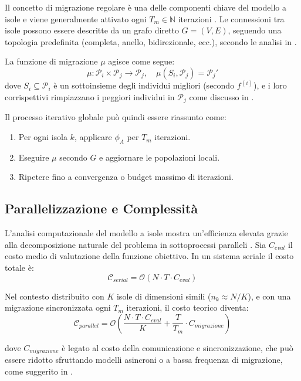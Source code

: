 \documentclass{article}
\begin{document}
Il concetto di migrazione regolare è una delle componenti chiave del modello a isole e viene 
generalmente attivato ogni $T_m \in \mathbb{N}$ iterazioni \cite{tomassini2005spatially}. 
Le connessioni tra isole possono essere descritte da un grafo diretto $G = (V, E)$, seguendo una 
topologia predefinita (completa, anello, bidirezionale, ecc.), secondo le analisi in \cite{cantupaz1998survey}.

La funzione di migrazione $\mu$ agisce come segue:
\[
\mu: \mathcal{P}_i \times \mathcal{P}_j \rightarrow \mathcal{P}_j, \quad \mu(S_i, \mathcal{P}_j) = \mathcal{P}_j'
\]
dove $S_i \subseteq \mathcal{P}_i$ è un sottoinsieme degli individui migliori (secondo $f^{(i)}$), e i loro corrispettivi rimpiazzano i peggiori individui in $\mathcal{P}_j$ come discusso in \cite{alba2002parallelism}.

Il processo iterativo globale può quindi essere riassunto come:

\begin{enumerate}
    \item Per ogni isola $k$, applicare $\phi_A$ per $T_m$ iterazioni.
    \item Eseguire $\mu$ secondo $G$ e aggiornare le popolazioni locali.
    \item Ripetere fino a convergenza o budget massimo di iterazioni.
\end{enumerate}

\subsection{Parallelizzazione e Complessità}

L'analisi computazionale del modello a isole mostra un'efficienza elevata grazie alla decomposizione 
naturale del problema in sottoprocessi paralleli \cite{alba2005parallel}. Sia $C_{eval}$ il costo medio 
di valutazione della funzione obiettivo. In un sistema seriale il costo totale è:
\[
\mathcal{C}_{serial} = \mathcal{O}(N \cdot T \cdot C_{eval})
\]

Nel contesto distribuito con $K$ isole di dimensioni simili ($n_k \approx N/K$), e con una migrazione 
sincronizzata ogni $T_m$ iterazioni, il costo teorico diventa:
\[
\mathcal{C}_{parallel} = \mathcal{O}\left(\frac{N \cdot T \cdot C_{eval}}{K} + \frac{T}{T_m} \cdot C_{migrazione}\right)
\]

dove $C_{migrazione}$ è legato al costo della comunicazione e sincronizzazione, che può essere ridotto 
sfruttando modelli asincroni o a bassa frequenza di migrazione, come suggerito in \cite{cantupaz1998survey}.
\end{document}
